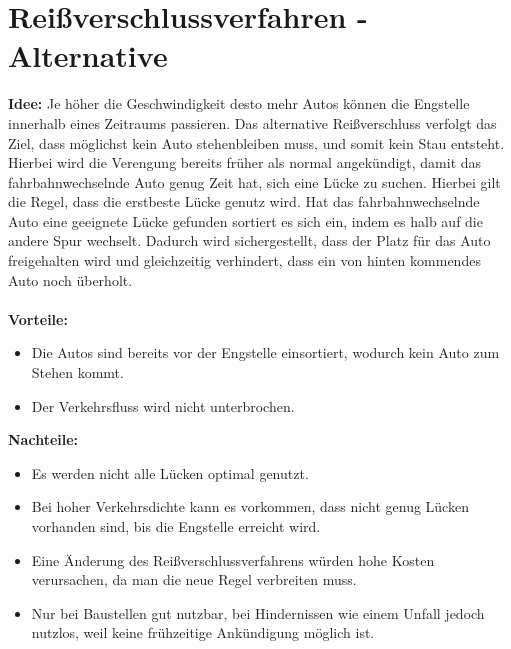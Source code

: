 \section{Reißverschlussverfahren - Alternative}
\textbf{Idee:} Je höher die Geschwindigkeit desto mehr Autos können die Engstelle innerhalb eines Zeitraums passieren. Das alternative Reißverschluss verfolgt das Ziel, dass möglichst kein Auto stehenbleiben muss, und somit kein Stau entsteht. Hierbei wird die Verengung bereits früher als normal angekündigt, damit das fahrbahnwechselnde Auto genug Zeit hat, sich eine Lücke zu suchen. Hierbei gilt die Regel, dass die erstbeste Lücke genutz wird. Hat das fahrbahnwechselnde Auto eine geeignete Lücke gefunden sortiert es sich ein, indem es halb auf die andere Spur wechselt. Dadurch wird sichergestellt, dass der Platz für das Auto freigehalten wird und gleichzeitig verhindert, dass ein von hinten kommendes Auto noch überholt. \\\\
\textbf{Vorteile:} 
\begin{itemize}
	\item Die Autos sind bereits vor der Engstelle einsortiert, wodurch kein Auto zum Stehen kommt.
\item Der Verkehrsfluss wird nicht unterbrochen.
\end{itemize}
\textbf{Nachteile:}
\begin{itemize}
	\item Es werden nicht alle Lücken optimal genutzt.
\item Bei hoher Verkehrsdichte kann es vorkommen, dass nicht genug Lücken vorhanden sind, bis die Engstelle erreicht wird.
\item Eine Änderung des Reißverschlussverfahrens würden hohe Kosten verursachen, da man die neue Regel verbreiten muss.
\item Nur bei Baustellen gut nutzbar, bei Hindernissen wie einem Unfall jedoch nutzlos, weil keine frühzeitige Ankündigung möglich ist.
\end{itemize}